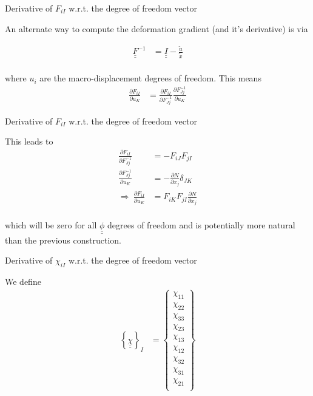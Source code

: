 \documentclass[11pt]{beamer}
\newcommand{\TEN}[1]{\underline{\underline{#1}}}
\newcommand{\VEC}[1]{\utilde{#1}}
\begin{document}
\begin{frame}{Derivative of $F_{iI}$ w.r.t. the degree of freedom vector}

An alternate way to compute the deformation gradient (and it's derivative) is via

\begin{align*}
\TEN{F}^{-1} &= \TEN{I} - \frac{\VEC{u}}{\VEC{x}}\\
\end{align*}

where $u_i$ are the macro-displacement degrees of freedom. This means
\begin{align*}
\frac{\partial F_{iI}}{\partial u_K} &=  \frac{\partial F_{iI}}{\partial F_{Jj}^{-1}}\frac{\partial F_{Jj}^{-1}}{\partial u_K}
\end{align*}

\end{frame}

\begin{frame}{Derivative of $F_{iI}$ w.r.t. the degree of freedom vector}

This leads to
\begin{align*}
\frac{\partial F_{iI}}{\partial F_{Jj}^{-1}} &= -F_{iJ} F_{jI}\\
\frac{\partial F_{Jj}^{-1}}{\partial u_K} &= -\frac{\partial N}{\partial x_j} \delta_{JK}\\
\Rightarrow\ \frac{\partial F_{iI}}{\partial u_K} &= F_{iK} F_{jI}\frac{\partial N}{\partial x_j}\\
\end{align*}

which will be zero for all $\TEN{\phi}$ degrees of freedom and is potentially more natural than the previous construction.

\end{frame}

\begin{frame}{Derivative of $\chi_{iI}$ w.r.t. the degree of freedom vector}

We define
\begin{align*}
\left\{\TEN{\chi}\right\}_I &= \left\{\begin{array}{c}
\chi_{11}\\
\chi_{22}\\
\chi_{33}\\
\chi_{23}\\
\chi_{13}\\
\chi_{12}\\
\chi_{32}\\
\chi_{31}\\
\chi_{21}\\
\end{array}\right\}
\end{align*}

\end{frame}
\end{document}
